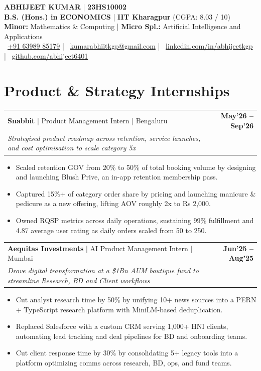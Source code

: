\documentclass[10pt, a4paper]{article}
\makeatletter
\newcommand{\jobheader}[4]{
  \vspace{-1pt}
  \begin{tabular*}{\textwidth}[t]{l@{\extracolsep{\fill}}r}
    \textbf{#1} \quad | \quad #3 & \textbf{\small #4} \\
    \textit{\small #2} & \\
  \end{tabular*}
  \vspace{-2pt}
}
\newenvironment{achievelist}{
  \begin{itemize}[leftmargin=1.2em, itemsep=0.5pt, parsep=0pt, topsep=1pt]
    \small
}{
  \end{itemize}
  \vspace{-2pt}
}
\newcommand{\achieve}[1]{\item #1}
\makeatother
\begin{document}
\begin{center}
  {\LARGE \textbf{ABHIJEET KUMAR}} \quad | \quad \textbf{23HS10002} \\[3pt]
  \textbf{B.S. (Hons.) in ECONOMICS} \quad | \quad \textbf{IIT Kharagpur} (CGPA: 8.03 / 10) \\[2pt]
  \small \textbf{Minor:} Mathematics \& Computing \quad | \quad \textbf{Micro Spl.:} Artificial Intelligence and Applications \\[3pt]
  \small
  \faPhone\ \href{tel:+916398985179}{+91 63989 85179} \quad | \quad
  \faEnvelope\ \href{mailto:kumarabhiitkgp@gmail.com}{kumarabhiitkgp@gmail.com} \quad | \quad
  \faLinkedin\ \href{https://linkedin.com/in/abhijeetkgp}{linkedin.com/in/abhijeetkgp} \quad | \quad
  \faGithub\ \href{https://github.com/abhijeet6401}{github.com/abhijeet6401}
\end{center}

\vspace{-4pt}

\section{Product \& Strategy Internships}

\jobheader{Snabbit}{Strategised product roadmap across retention, service launches, and cost optimisation to scale category 5x}{Product Management Intern | Bengaluru}{May'26 -- Sep'26}
\begin{achievelist}
  \achieve{Scaled retention GOV from 20\% to 50\% of total booking volume by designing and launching Blush Prive, an in-app retention membership pass.}
  \achieve{Captured 15\%+ of category order share by pricing and launching manicure \& pedicure as a new offering, lifting AOV roughly 2x to Rs 2,000.}
  \achieve{Owned RQSP metrics across daily operations, sustaining 99\% fulfillment and 4.87 average user rating as daily orders scaled from 50 to 250.}
\end{achievelist}

\jobheader{Aequitas Investments}{Drove digital transformation at a \$1Bn AUM boutique fund to streamline Research, BD and Client workflows}{AI Product Management Intern | Mumbai}{Jun'25 -- Aug'25}
\begin{achievelist}
  \achieve{Cut analyst research time by 50\% by unifying 10+ news sources into a PERN + TypeScript research platform with MiniLM-based deduplication.}
  \achieve{Replaced Salesforce with a custom CRM serving 1,000+ HNI clients, automating lead tracking and deal pipelines for BD and onboarding teams.}
  \achieve{Cut client response time by 30\% by consolidating 5+ legacy tools into a platform optimizing comms across research, BD, ops, and fund teams.}
\end{achievelist}
\end{document}
